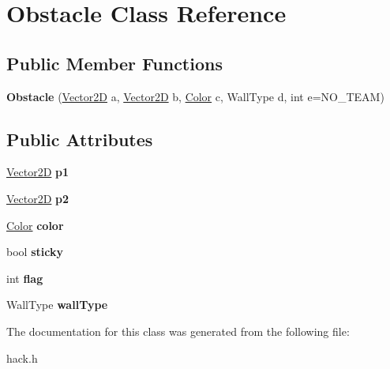 \hypertarget{class_obstacle}{\section{Obstacle Class Reference}
\label{class_obstacle}
}
\subsection*{Public Member Functions}
\begin{DoxyCompactItemize}
\item 
\hypertarget{class_obstacle_ab700c6e78d18d2a2b624a65c50e79b2d}{{\bfseries Obstacle} (\hyperlink{class_vector2_d}{Vector2\-D} a, \hyperlink{class_vector2_d}{Vector2\-D} b, \hyperlink{class_color}{Color} c, Wall\-Type d, int e=N\-O\-\_\-\-T\-E\-A\-M)}\label{class_obstacle_ab700c6e78d18d2a2b624a65c50e79b2d}

\end{DoxyCompactItemize}
\subsection*{Public Attributes}
\begin{DoxyCompactItemize}
\item 
\hypertarget{class_obstacle_ab8a54c75f67fcd88623131d45e0589b2}{\hyperlink{class_vector2_d}{Vector2\-D} {\bfseries p1}}\label{class_obstacle_ab8a54c75f67fcd88623131d45e0589b2}

\item 
\hypertarget{class_obstacle_a4c453b0020f3b3f09052082e6b87de48}{\hyperlink{class_vector2_d}{Vector2\-D} {\bfseries p2}}\label{class_obstacle_a4c453b0020f3b3f09052082e6b87de48}

\item 
\hypertarget{class_obstacle_ab5b698fc36de4c1e15730219ddd579c9}{\hyperlink{class_color}{Color} {\bfseries color}}\label{class_obstacle_ab5b698fc36de4c1e15730219ddd579c9}

\item 
\hypertarget{class_obstacle_aded042e99ff96538f3d4aa70a1da25ba}{bool {\bfseries sticky}}\label{class_obstacle_aded042e99ff96538f3d4aa70a1da25ba}

\item 
\hypertarget{class_obstacle_a041170d3a6a105eb72e94b821dbea239}{int {\bfseries flag}}\label{class_obstacle_a041170d3a6a105eb72e94b821dbea239}

\item 
\hypertarget{class_obstacle_abb6983458bd420b3e2f8fde6000c308a}{Wall\-Type {\bfseries wall\-Type}}\label{class_obstacle_abb6983458bd420b3e2f8fde6000c308a}

\end{DoxyCompactItemize}


The documentation for this class was generated from the following file\-:\begin{DoxyCompactItemize}
\item 
hack.\-h\end{DoxyCompactItemize}
